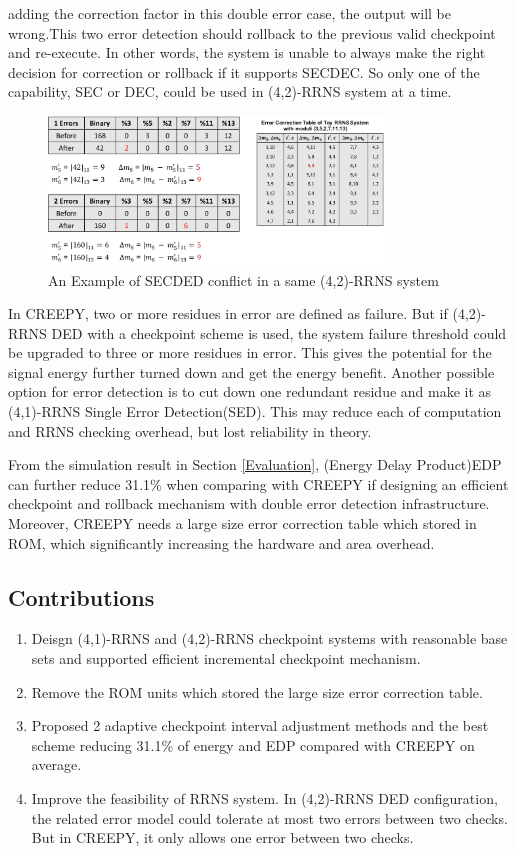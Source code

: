 \documentclass{sig-alternate}
\begin{document}
adding the correction factor in this double error case, the output will be wrong.This two error detection should rollback to the previous valid checkpoint and re-execute. In other words, the system is unable to always make the right decision for correction or rollback if it supports SECDEC. So only one of the capability, SEC or DEC, could be used in (4,2)-RRNS system at a time.  

\begin{figure}[H]
\centering
\includegraphics[width=3.5in]{graphics/SECorDED.pdf}

\caption{An Example of SECDED conflict in a same (4,2)-RRNS system}
\label{fig_SECDED}
\end{figure}

In CREEPY, two or more residues in error are defined as failure. But if (4,2)-RRNS DED with a checkpoint scheme is used, the system failure threshold could be upgraded to three or more residues in error. This gives the potential for the signal energy further turned down and get the energy benefit. Another possible option for error detection is to cut down one redundant residue and make it as (4,1)-RRNS Single Error Detection(SED). This may reduce each of computation and RRNS checking overhead, but lost reliability in theory. 

From the simulation result in Section \ref{Evaluation}, (Energy Delay Product)EDP can further reduce 31.1\% when comparing  with CREEPY if designing an efficient checkpoint and rollback mechanism with double error detection infrastructure. Moreover, CREEPY needs a large size error correction table which stored in ROM, which significantly increasing the hardware and area overhead. 

\subsection{Contributions}
\begin{enumerate}
\item Deisgn (4,1)-RRNS and (4,2)-RRNS checkpoint systems with reasonable base sets and supported efficient incremental checkpoint mechanism. 
\item Remove the ROM units which stored the large size error correction table. 
\item Proposed 2 adaptive checkpoint interval adjustment methods and the best scheme reducing 31.1\% of energy and EDP compared with CREEPY on average. 
\item Improve the feasibility of RRNS system. In  (4,2)-RRNS DED configuration, the related error model could tolerate at most two errors between two checks. But in CREEPY, it only allows one error between two checks. 
\end{enumerate}
\end{document}

